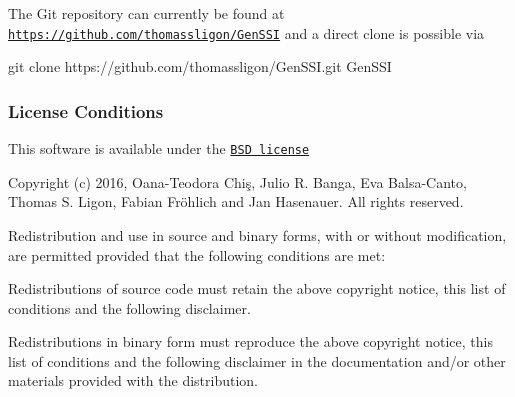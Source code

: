 The Git repository can currently be found at \href{https://github.com/thomassligon/GenSSI}{\tt https\+://github.\+com/thomassligon/\+Gen\+S\+SI} and a direct clone is possible via 
\begin{DoxyCode}
git clone https:\textcolor{comment}{//github.com/thomassligon/GenSSI.git GenSSI }
\end{DoxyCode}
\hypertarget{index_GenSSI}{}\subsubsection{License Conditions}\label{index_GenSSI}
This software is available under the \href{http://www.opensource.org/licenses/bsd-license.php}{\tt B\+SD license}

Copyright (c) 2016, Oana-\/\+Teodora Chiş, Julio R. Banga, Eva Balsa-\/\+Canto, Thomas S. Ligon, Fabian Fröhlich and Jan Hasenauer. All rights reserved.

Redistribution and use in source and binary forms, with or without modification, are permitted provided that the following conditions are met\+:
\begin{DoxyItemize}
\item Redistributions of source code must retain the above copyright notice, this list of conditions and the following disclaimer.
\item Redistributions in binary form must reproduce the above copyright notice, this list of conditions and the following disclaimer in the documentation and/or other materials provided with the distribution.
\end{DoxyItemize}

